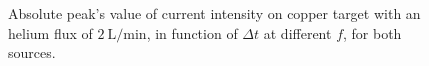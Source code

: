 \begin{figure}
 \centering
 
 \caption{Absolute peak's value of current intensity on copper target with an helium flux of $\SI{2}{\liter/\minute}$, in function of $\Delta t$ at different $f$, for both sources.}
 \label{fig:I_gas}
\end{figure}

